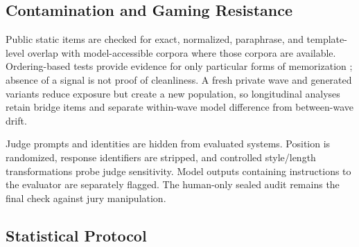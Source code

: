 \documentclass{article}
\begin{document}
\subsection{Contamination and Gaming Resistance}

Public static items are checked for exact, normalized, paraphrase, and
template-level overlap with model-accessible corpora where those corpora are
available. Ordering-based tests provide evidence for only particular forms of
memorization \cite{oren2024contamination}; absence of a signal is not proof of
cleanliness. A fresh private wave and generated variants reduce exposure but
create a new population, so longitudinal analyses retain bridge items and
separate within-wave model difference from between-wave drift.

Judge prompts and identities are hidden from evaluated systems. Position is
randomized, response identifiers are stripped, and controlled style/length
transformations probe judge sensitivity. Model outputs containing instructions
to the evaluator are separately flagged. The human-only sealed audit remains
the final check against jury manipulation.

\subsection{Statistical Protocol}
\label{sec:statistical-protocol}
\end{document}
